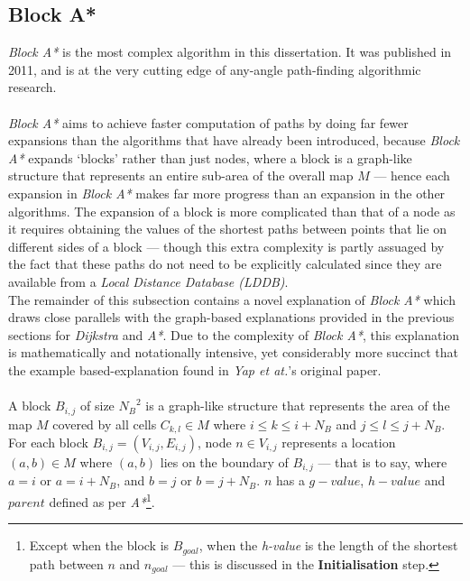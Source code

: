 \documentclass[12pt,notitlepage]{report}
\begin{document}
\subsection {Block A*}

\noindent
{\em Block A*} is the most complex algorithm in this dissertation. It was published in 2011, and is at the very cutting edge of any-angle path-finding algorithmic research.\\

\\
\noindent
{\em Block A*} aims to achieve faster computation of paths by doing far fewer expansions than the algorithms that have already been introduced, because {\em Block A*} expands `blocks' rather than just nodes, where a block is a graph-like structure that represents an entire sub-area of the overall map $M$ --- hence each expansion in {\em Block A*} makes far more progress than an expansion in the other algorithms. The expansion of a block is more complicated than that of a node as it requires obtaining the values of the shortest paths between points that lie on different sides of a block --- though this extra complexity is partly assuaged by the fact that these paths do not need to be explicitly calculated since they are available from a {\em Local Distance Database (LDDB)}.\\

\noindent
The remainder of this subsection contains a novel explanation of {\em Block A*} which draws close parallels with the graph-based explanations provided in the previous sections for {\em Dijkstra} and {\em A*}. Due to the complexity of {\em Block A*}, this explanation is mathematically and notationally intensive, yet considerably more succinct that the example based-explanation found in {\em Yap et at.}'s original paper\cite{Yap11}.\\

\\
\noindent
A block $B_{i,j}$ of size ${N_{B}}^{2}$ is a graph-like structure that represents the area of the map $M$ covered by all cells $C_{k,l} \in M$ where $i \leq k \leq i+N_{B}$ and $j \leq l \leq j+N_{B}$.\\

\noindent
For each block $B_{i,j} = (V_{i,j},E_{i,j})$, node $n \in V_{i,j}$ represents a location $(a,b) \in M$ where $(a,b)$ lies on the boundary of $B_{i,j}$ --- that is to say, where $a=i$ or $a=i+N_{B}$, and $b=j$ or $b=j+N_{B}$. $n$ has a $g-value$, $h-value$ and $parent$ defined as per {\em A*}\footnote{Except when the block is $B_{goal}$, when the {\em h-value} is the length of the shortest path between $n$ and $n_{goal}$ --- this is discussed in the {\bfseries Initialisation} step.}.\\
\end{document}
